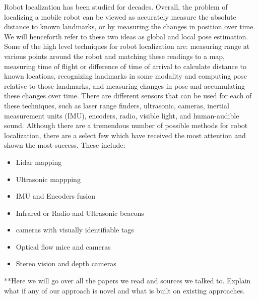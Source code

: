 \documentclass{article}
\begin{document}
Robot localization has been studied for decades. Overall, the problem of localizing a mobile robot can be viewed as accurately measure the absolute distance to known landmarks, or by measuring the changes in position over time. We will henceforth refer to these two ideas as global and local pose estimation. Some of the high level techniques for robot localization are: measuring range at various points around the robot and matching these readings to a map, measuring time of flight or difference of time of arrival to calculate distance to known locations, recognizing landmarks in some modality and computing pose relative to those landmarks, and measuring changes in pose and accumulating these changes over time. There are different sensors that can be used for each of these techniques, such as laser range finders, ultrasonic, cameras, inertial measurement units (IMU), encoders, radio, visible light, and human-audible sound. Although there are a tremendous number of possible methods for robot localization, there are a select few which have received the most attention and shown the most success. These include:
\begin{itemize}
    \item Lidar mapping
    \item Ultrasonic mappping
    \item IMU and Encoders fusion
    \item Infrared or Radio and Ultrasonic beacons
    \item cameras with visually identifiable tags
    \item Optical flow mice and cameras
    \item Stereo vision and depth cameras
\end{itemize}

**Here we will go over all the papers we read and sources we talked to. Explain what if any of our approach is novel and what is built on existing approaches.
\end{document}
